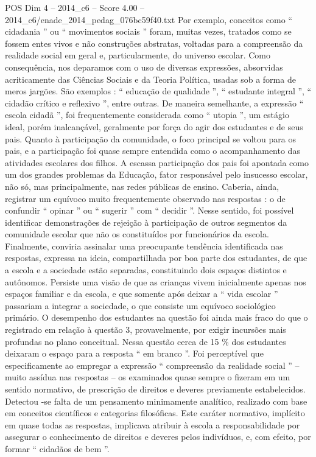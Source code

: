 \begin{textsample}{POS Dim 4 – 2014\_c6 – Score 4.00 – 2014\_c6/enade\_2014\_pedag\_076bc59f40.txt}
Por exemplo, conceitos como “ cidadania ” ou “ movimentos sociais ” foram, muitas vezes, tratados como se fossem entes vivos e não construções abstratas, voltadas para a compreensão da realidade social em geral e, particularmente, do universo escolar.
Como consequência, nos deparamos com o uso de diversas expressões, absorvidas acriticamente das Ciências Sociais e da Teoria Política, usadas sob a forma de meros jargões.
São exemplos : “ educação de qualidade ”, “ estudante integral ”, “ cidadão crítico e reflexivo ”, entre outras.
De maneira semelhante, a expressão “ escola cidadã ”, foi frequentemente considerada como “ utopia ”, um estágio ideal, porém inalcançável, geralmente por força do agir dos estudantes e de seus pais.
Quanto à participação da comunidade, o foco principal se voltou para os pais, e a participação foi quase sempre entendida como o acompanhamento das atividades escolares dos filhos.
A escassa participação dos pais foi apontada como um dos grandes problemas da Educação, fator responsável pelo insucesso escolar, não só, mas principalmente, nas redes públicas de ensino.
Caberia, ainda, registrar um equívoco muito frequentemente observado nas respostas : o de confundir “ opinar ” ou “ sugerir ” com “ decidir ”.
Nesse sentido, foi possível identificar demonstrações de rejeição à participação de outros segmentos da comunidade escolar que não os constituídos por funcionários da escola.
Finalmente, conviria assinalar uma preocupante tendência identificada nas respostas, expressa na ideia, compartilhada por boa parte dos estudantes, de que a escola e a sociedade estão separadas, constituindo dois espaços distintos e autônomos.
Persiste uma visão de que as crianças vivem inicialmente apenas nos espaços familiar e da escola, e que somente após deixar a “ vida escolar ” passariam a integrar a sociedade, o que consiste um equívoco sociológico primário.
O desempenho dos estudantes na questão foi ainda mais fraco do que o registrado em relação à questão 3, provavelmente, por exigir incursões mais profundas no plano conceitual.
Nessa questão cerca de 15 \% dos estudantes deixaram o espaço para a resposta “ em branco ”.
Foi perceptível que especificamente ao empregar a expressão “ compreensão da realidade social ” – muito assídua nas respostas – os examinados quase sempre o fizeram em um sentido normativo, de prescrição de direitos e deveres previamente estabelecidos.
Detectou -se falta de um pensamento minimamente analítico, realizado com base em conceitos científicos e categorias filosóficas.
Este caráter normativo, implícito em quase todas as respostas, implicava atribuir à escola a responsabilidade por assegurar o conhecimento de direitos e deveres pelos indivíduos, e, com efeito, por formar “ cidadãos de bem ”.

\end{textsample}
